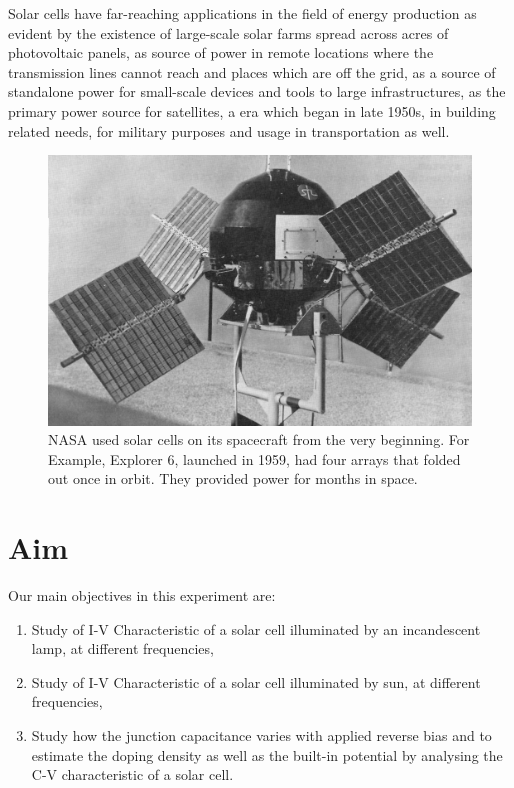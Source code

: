 \documentclass[%
 aip,
 amsmath,amssymb,
 reprint, floatfix%
]{revtex4-2}
\begin{document}
    \par
    Solar cells have far-reaching applications in the field of energy production as evident by the existence of large-scale solar farms spread across acres of photovoltaic panels, as source of power in remote locations where the transmission lines cannot reach and places which are off the grid, as a source of standalone power for small-scale devices and tools to large infrastructures, as the primary power source for satellites, a era which began in late 1950s, in building related needs, for military purposes and usage in transportation as well.
    \begin{figure}
        \centering
        \includegraphics[scale = 1.65]{Figures/Explorer_6_paddles_up}
        \caption{NASA used solar cells on its spacecraft from the very beginning. For Example, Explorer 6, launched in 1959, had four arrays that folded out once in orbit. They provided power for months in space.}
        \label{fig:explorer}
    \end{figure}
    


\section{Aim}
    Our main objectives in this experiment are:
    \begin{enumerate}
        \item Study of I-V Characteristic of a solar cell illuminated by an incandescent lamp, at different frequencies,
        \item Study of I-V Characteristic of a solar cell illuminated by sun, at different frequencies,
        \item Study how the junction capacitance varies with applied reverse bias and to estimate the doping density as well as the built-in potential by analysing the C-V characteristic of a solar cell.
    \end{enumerate}
    
\end{document}
